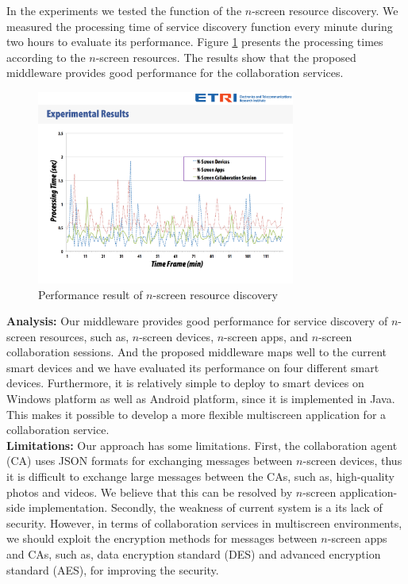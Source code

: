 \documentclass{sig-alternate}
\begin{document}
In the experiments we tested the function of the $n$-screen resource discovery. We measured the processing time of  service discovery function every minute during two hours to evaluate its performance. Figure \ref{fig:performance} presents the processing times according to the $n$-screen resources.
The results show that the proposed middleware provides good performance for the collaboration services.\\
    \begin{figure}[htb] %
    \centering
    \includegraphics[width=8.5cm,keepaspectratio]{performance}
    \caption{Performance result of $n$-screen resource discovery}
    \label{fig:performance}
    \end{figure}

    \noindent
    {\bf Analysis:} Our middleware provides good performance for service discovery of $n$-screen resources, such as, $n$-screen devices, $n$-screen apps, and $n$-screen collaboration sessions.
    And the proposed middleware maps well to the current smart devices and we have evaluated its performance on four different smart devices.
    Furthermore, it is relatively simple to deploy to smart devices on Windows platform as well as Android platform, since it is implemented in Java.
This makes it possible to develop a more flexible multiscreen application for a collaboration service. \\

   \noindent
    {\bf Limitations:}
    Our approach has some limitations.
    First, the collaboration agent (CA) uses JSON formats for exchanging messages between $n$-screen devices, thus it is difficult to exchange large messages between the CAs, such as, high-quality photos and videos.  We believe that this can be resolved by $n$-screen application-side implementation.
  Secondly, the weakness of current system is a its lack of security.
  However, in terms of collaboration services in multiscreen environments, we should exploit the encryption methods for messages between $n$-screen apps and CAs, such as, data encryption standard (DES) and advanced encryption standard (AES), for improving the security.
\end{document}

